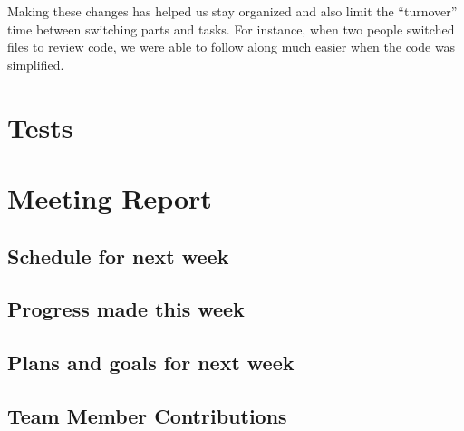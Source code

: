 \documentclass[12pt]{article}
\begin{document}
Making these changes has helped us stay organized and also limit the
“turnover” time between switching parts and tasks. For instance, when two
people switched files to review code, we were able to follow along much
easier when the code was simplified.

\section{Tests}



\section{Meeting Report}
\subsection{Schedule for next week}

\subsection{Progress made this week}

\subsection{Plans and goals for next week}
\subsection{Team Member Contributions}
\end{document}
